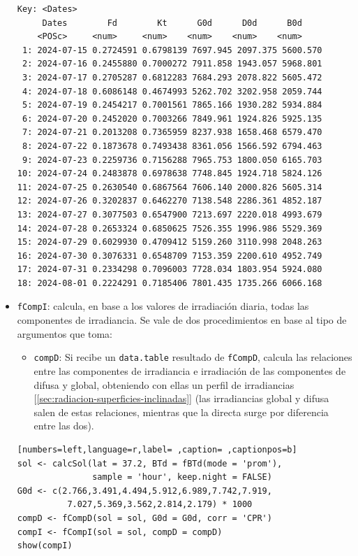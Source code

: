 \begin{itemize}
\begin{verbatim}
Key: <Dates>
	 Dates        Fd        Kt      G0d      D0d      B0d
	<POSc>     <num>     <num>    <num>    <num>    <num>
 1: 2024-07-15 0.2724591 0.6798139 7697.945 2097.375 5600.570
 2: 2024-07-16 0.2455880 0.7000272 7911.858 1943.057 5968.801
 3: 2024-07-17 0.2705287 0.6812283 7684.293 2078.822 5605.472
 4: 2024-07-18 0.6086148 0.4674993 5262.702 3202.958 2059.744
 5: 2024-07-19 0.2454217 0.7001561 7865.166 1930.282 5934.884
 6: 2024-07-20 0.2452020 0.7003266 7849.961 1924.826 5925.135
 7: 2024-07-21 0.2013208 0.7365959 8237.938 1658.468 6579.470
 8: 2024-07-22 0.1873678 0.7493438 8361.056 1566.592 6794.463
 9: 2024-07-23 0.2259736 0.7156288 7965.753 1800.050 6165.703
10: 2024-07-24 0.2483878 0.6978638 7748.845 1924.718 5824.126
11: 2024-07-25 0.2630540 0.6867564 7606.140 2000.826 5605.314
12: 2024-07-26 0.3202837 0.6462270 7138.548 2286.361 4852.187
13: 2024-07-27 0.3077503 0.6547900 7213.697 2220.018 4993.679
14: 2024-07-28 0.2653324 0.6850625 7526.355 1996.986 5529.369
15: 2024-07-29 0.6029930 0.4709412 5159.260 3110.998 2048.263
16: 2024-07-30 0.3076331 0.6548709 7153.359 2200.610 4952.749
17: 2024-07-31 0.2334298 0.7096003 7728.034 1803.954 5924.080
18: 2024-08-01 0.2224291 0.7185406 7801.435 1735.266 6066.168
\end{verbatim}

\item \texttt{fCompI}: calcula, en base a los valores de irradiación diaria, todas las componentes de irradiancia. Se vale de dos procedimientos en base al tipo de argumentos que toma:
\begin{itemize}
\item \texttt{compD}: Si recibe un \texttt{data.table} resultado de \texttt{fCompD}, calcula las relaciones entre las componentes de irradiancia e irradiación de las componentes de difusa y global, obteniendo con ellas un perfil de irradiancias [\ref{sec:radiacion-superficies-inclinadas}] (las irradiancias global y difusa salen de estas relaciones, mientras que la directa surge por diferencia entre las dos).
\end{itemize}
\begin{lstlisting}[numbers=left,language=r,label= ,caption= ,captionpos=b]
sol <- calcSol(lat = 37.2, BTd = fBTd(mode = 'prom'),
               sample = 'hour', keep.night = FALSE)
G0d <- c(2.766,3.491,4.494,5.912,6.989,7.742,7.919,
          7.027,5.369,3.562,2.814,2.179) * 1000
compD <- fCompD(sol = sol, G0d = G0d, corr = 'CPR')
compI <- fCompI(sol = sol, compD = compD)
show(compI)
\end{lstlisting}


\end{itemize}
